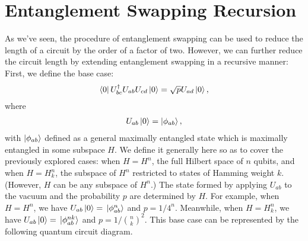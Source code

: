 \documentclass[10pt]{article}
\begin{document}
\section{Entanglement Swapping Recursion}

As we've seen, the procedure of entanglement swapping can be used to reduce the length of a circuit by the order of a factor of two. However, we can further reduce the circuit length by extending entanglement swapping in a recursive manner: First, we define the base case:
\begin{align}
\bra{0}U^\dagger_{bc}U_{ab}U_{cd}\ket{0}
=
\sqrt{p}U_{ad}\ket{0}
,\end{align}
where
\begin{align}
U_{ab}\ket{0}=\ket{\phi_{ab}}
,\end{align}
with $\ket{\phi_{ab}}$ defined as a general maximally entangled state which is maximally entangled in some subspace $H$. We define it generally here so as to cover the previously explored cases: when $H=H^n$, the full Hilbert space of $n$ qubits, and when $H=H^n_k$, the subspace of $H^n$ restricted to states of Hamming weight $k$. (However, $H$ can be any subspace of $H^n$.) The state formed by applying $U_{ab}$ to the vacuum and the probability $p$ are determined by $H$. For example, when $H=H^n$, we have $U_{ab}\ket{0}=\ket*{\phi^n_{ab}}$ and $p=1/4^n$. Meanwhile, when $H=H^n_k$, we have $U_{ab}\ket{0}=\ket*{\phi^{nk}_{ab}}$ and $p=1/{n \choose k}^2$. This base case can be represented by the following quantum circuit diagram.
\end{document}
